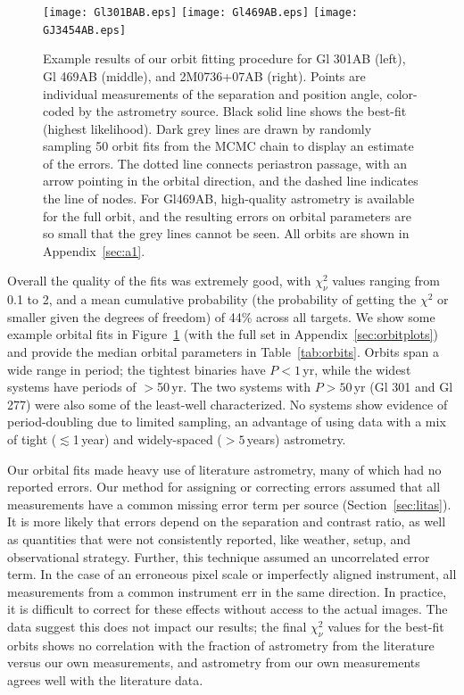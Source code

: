 \documentclass[twocolumn]{aastex62}
\begin{document}
\begin{figure}[htb]
\begin{center}
\texttt{[image: Gl301BAB.eps]}
\texttt{[image: Gl469AB.eps]}
\texttt{[image: GJ3454AB.eps]}
\caption{Example results of our orbit fitting procedure for Gl 301AB (left), Gl 469AB (middle), and 2M0736+07AB (right). Points are individual measurements of the separation and position angle, color-coded by the astrometry source. Black solid line shows the best-fit (highest likelihood). Dark grey lines are drawn by randomly sampling 50 orbit fits from the MCMC chain to display an estimate of the errors. The dotted line connects periastron passage, with an arrow pointing in the orbital direction, and the dashed line indicates the line of nodes. For Gl469AB, high-quality astrometry is available for the full orbit, and the resulting errors on orbital parameters are so small that the grey lines cannot be seen. All orbits are shown in Appendix~\ref{sec:a1}.}
\label{fig:orbits}
\end{center}
\end{figure}

Overall the quality of the fits was extremely good, with $\chi^2_\nu$ values ranging from 0.1 to 2, and a mean cumulative probability (the probability of getting the $\chi^2$ or smaller given the degrees of freedom) of 44\% across all targets. We show some example orbital fits in Figure~\ref{fig:orbits} (with the full set in Appendix~\ref{sec:orbitplots}) and provide the median orbital parameters in Table~\ref{tab:orbits}. Orbits span a wide range in period; the tightest binaries have $P<1$\,yr, while the widest systems have periods of $>$50\,yr. The two systems with $P>50$\,yr (Gl 301 and Gl 277) were also some of the least-well characterized. No systems show evidence of period-doubling due to limited sampling, an advantage of using data with a mix of tight ($\lesssim$1\,year) and widely-spaced ($>5$\,years) astrometry.

Our orbital fits made heavy use of literature astrometry, many of which had no reported errors. Our method for assigning or correcting errors assumed that all measurements have a common missing error term per source (Section~\ref{sec:litas}). It is more likely that errors depend on the separation and contrast ratio, as well as quantities that were not consistently reported, like weather, setup, and observational strategy. Further, this technique assumed an uncorrelated error term. In the case of an erroneous pixel scale or imperfectly aligned instrument, all measurements from a common instrument err in the same direction. In practice, it is difficult to correct for these effects without access to the actual images. The data suggest this does not impact our results; the final $\chi^2_\nu$ values for the best-fit orbits shows no correlation with the fraction of astrometry from the literature versus our own measurements, and astrometry from our own measurements agrees well with the literature data. 
\end{document}
